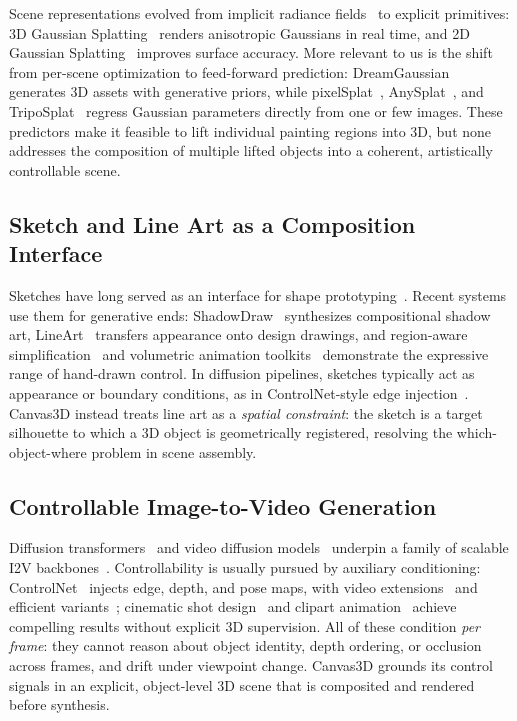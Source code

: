 Scene representations evolved from implicit radiance
fields~\cite{mildenhall2020nerf} to explicit primitives: 3D Gaussian
Splatting~\cite{kerbl20233dgs} renders anisotropic Gaussians in real
time, and 2D Gaussian Splatting~\cite{huang20242dgs} improves surface
accuracy. More relevant to us is the shift from per-scene optimization
to feed-forward prediction: DreamGaussian~\cite{tang2024dreamgaussian}
generates 3D assets with generative priors, while
pixelSplat~\cite{charatan2024pixelsplat}, AnySplat~\cite{jiang2025anysplat},
and TripoSplat~\cite{tripo2025tritosplat} regress Gaussian parameters
directly from one or few images. These predictors make it feasible to
lift individual painting regions into 3D, but none addresses the
composition of multiple lifted objects into a coherent, artistically
controllable scene.

\subsection{Sketch and Line Art as a Composition Interface}

Sketches have long served as an interface for shape
prototyping~\cite{olson2009sketch}. Recent systems use them for
generative ends: ShadowDraw~\cite{luo2025shadowdraw} synthesizes
compositional shadow art, LineArt~\cite{wang2025lineart} transfers
appearance onto design drawings, and region-aware
simplification~\cite{nguyen2024region} and volumetric animation
toolkits~\cite{foxgieg2024lightning} demonstrate the expressive range
of hand-drawn control. In diffusion pipelines, sketches typically act
as appearance or boundary conditions, as in ControlNet-style edge
injection~\cite{zhang2023controlnet}. Canvas3D instead treats line art
as a \emph{spatial constraint}: the sketch is a target silhouette to
which a 3D object is geometrically registered, resolving the
which-object-where problem in scene assembly.

\subsection{Controllable Image-to-Video Generation}

Diffusion transformers~\cite{peebles2023dit} and video diffusion
models~\cite{ho2022vdm,ho2022video} underpin a family of scalable I2V
backbones~\cite{blattmann2023svd,wan2025,guo2023animatediff,yang2025cogvideox}.
Controllability is usually pursued by auxiliary conditioning:
ControlNet~\cite{zhang2023controlnet} injects edge, depth, and pose
maps, with video extensions~\cite{wang2025easycontrol} and efficient
variants~\cite{peng2024controlnext}; cinematic shot
design~\cite{xing2025motioncanvas} and clipart
animation~\cite{wu2025aniclipart} achieve compelling results without
explicit 3D supervision. All of these condition \emph{per frame}: they
cannot reason about object identity, depth ordering, or occlusion
across frames, and drift under viewpoint change. Canvas3D grounds its
control signals in an explicit, object-level 3D scene that is
composited and rendered before synthesis.

